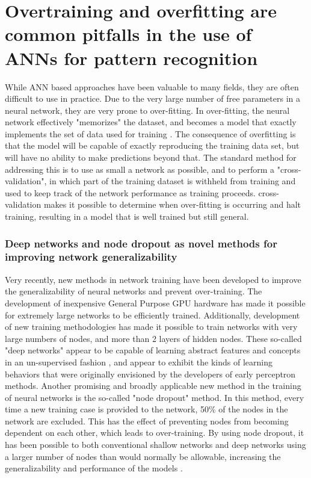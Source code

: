 \section{Overtraining and overfitting are common pitfalls in the use of \acs{ANN}s for pattern recognition}
\label{sec:intro_overtraining}
While \ac{ANN} based approaches have been valuable to many fields, they are often difficult to use in practice.
Due to the very large number of free parameters in a neural network, they are very prone to over-fitting.
In over-fitting, the neural network effectively "memorizes" the dataset, and becomes a model that exactly implements the set of data used for training \citep{Tetko:1995cm}.
The consequence of overfitting is that the model will be capable of exactly reproducing the training data set, but will have no ability to make predictions beyond that.
The standard method for addressing this is to use as small a network as possible, and to perform a "cross-validation", in which part of the training dataset is withheld from training and used to keep track of the network performance as training proceeds.
cross-validation makes it possible to determine when over-fitting is occurring and halt training, resulting in a model that is well trained but still general.

\subsubsection{Deep networks and node dropout as novel methods for improving network generalizability}
Very recently, new methods in network training have been developed to improve the generalizability of neural networks and prevent over-training.
The development of inexpensive General Purpose \ac{GPU} hardware has made it possible for extremely large networks to be efficiently trained. 
Additionally, development of new training methodologies \citep{Hinton:2006dy} has made it possible to train networks with very large numbers of nodes, and more than 2 layers of hidden nodes.
These so-called "deep networks" appear to be capable of learning abstract features and concepts in an un-supervised fashion \citep{Le:2013kz}, and appear to exhibit the kinds of learning behaviors that were originally envisioned by the developers of early perceptron methods. 
Another promising and broadly applicable new method in the training of neural networks is the so-called "node dropout" method.
In this method, every time a new training case is provided to the network, 50\% of the nodes in the network are excluded.
This has the effect of preventing nodes from becoming dependent on each other, which leads to over-training.
By using node dropout, it has been possible to both conventional shallow networks and deep networks using a larger number of nodes than would normally be allowable, increasing the generalizability and performance of the models \citep{Hinton:2012tv}.

